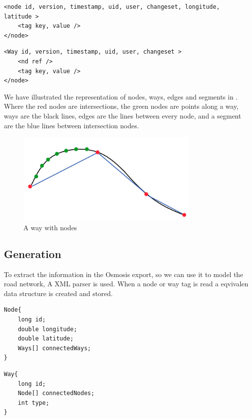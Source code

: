 \begin{lstlisting}[style=XML, caption=Node representation]
<node id, version, timestamp, uid, user, changeset, longitude, latitude >
	<tag key, value />
</node>
\end{lstlisting}

\begin{lstlisting}[style=XML, caption=Way representation]
<Way id, version, timestamp, uid, user, changeset >
	<nd ref />
	<tag key, value />
</node>
\end{lstlisting}

We have illustrated the representation of nodes, ways, edges and segments in . Where the red nodes are intersections, the green nodes are points along a way, ways are the black lines, edges are the lines between every node, and a segment are the blue lines between intersection nodes.

\begin{figure}[h!]
  \centering
    \includegraphics[width=0.8\textwidth]{figures/way-w-nodes.png}
    \caption{A way with nodes}
    \label{fig:waywithnodes}
\end{figure}

\subsection{Generation}
To extract the information in the Osmosis export, so we can use it to model the road network, A XML parser is used. When a node or way tag is read a eqvivalen data structure is created and stored. 
\begin{lstlisting}[style=java, caption=Datastructure for a node]
Node{
	long id;
	double longitude;
	double latitude;
	Ways[] connectedWays;
}
\end{lstlisting}

\begin{lstlisting}[style=java, caption=Datastructure for a way]
Way{
	long id;
	Node[] connectedNodes;
	int type;
}
\end{lstlisting}

